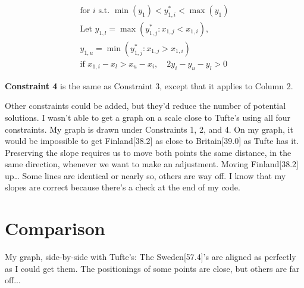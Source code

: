 \documentclass[12pt,twoside]{extarticle}
\begin{document}
{\begin{minipage}[t]{0.53\textwidth}
\begin{gather}
\text{for }i \text{ s.t. }\min(y_1) < y_{1,i}^* < \max(y_1) \\
\text{Let } y_{1,l} = \max(y_{1,j}^*:x_{1,j} < x_{1,i}), \\
y_{1,u} = \min(y_{1,j}^*:x_{1,j} > x_{1,i})\\
\text{if }x_{1,i}-x_l > x_u-x_i, \quad 2y_i-y_u-y_l > 0
\end{gather}

\textbf{Constraint 4} is the same as Constraint 3, except that it applies to Column 2. 


Other constraints could be added, but they'd reduce the number of potential solutions.  I wasn't able to get a graph on a scale close to Tufte's using all four constraints.  My graph is drawn under Constraints 1, 2, and 4. 
On my graph, it would be impossible to get Finland[38.2] as close to Britain[39.0] as Tufte has it.  Preserving the slope requires us to move both points the same distance, in the same direction, whenever we want to make an adjustment.  Moving Finland[38.2] up… 
Some lines are identical or nearly so, others are way off.  I know that my slopes are correct because there’s a check at the end of my code.
\end{minipage}}
\newpage
\begin{minipage}[]{0.42\textwidth}
\section{Comparison}
\textcolor{myblue}{My graph}, side-by-side with Tufte's:  The Sweden[57.4]'s are aligned as perfectly as I could get them.  The positionings of some points are close, but others are far off...
\end{minipage}%
\hfill
\vspace{1.5em}
\end{document}
